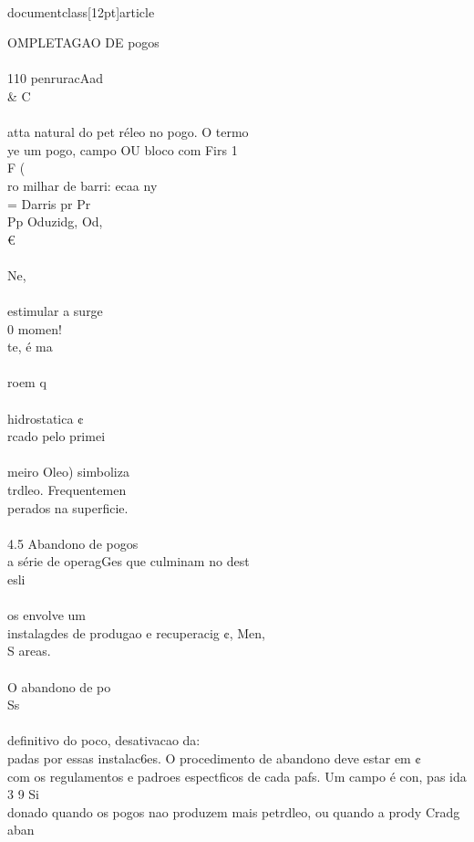 \\documentclass[12pt]{article}
\begin{document}
OMPLETAGAO DE pogos\\
\\
110 penruracAad \\& C\\
\\
atta natural do pet réleo no pogo. O termo\\
ye um pogo, campo OU bloco com Firs 1\\
F (\\
ro milhar de barri: ecaa ny\\
= Darris pr Pr\\
Pp Oduzidg, Od,\\
€\\
\\
Ne,\\
\\
estimular a surge\\
0 momen!\\
te, é ma\\
\\
roem q\\
\\
hidrostatica ¢\\
rcado pelo primei\\
\\
meiro Oleo) simboliza\\
trdleo. Frequentemen\\
perados na superficie.\\
\\
4.5 Abandono de pogos\\
a série de operagGes que culminam no dest\\
esli\\
\\
os envolve um\\
instalagdes de produgao e recuperacig ¢, Men,\\
S areas.\\
\\
O abandono de po\\
Ss\\
\\
definitivo do poco, desativacao da:\\
padas por essas instalac6es. O procedimento de abandono deve estar em ¢\\
com os regulamentos e padroes espectficos de cada pafs. Um campo é con, pas ida\\
3 9 Si\\
donado quando os pogos nao produzem mais petrdleo, ou quando a prody Cradg aban\\
\end{document}
